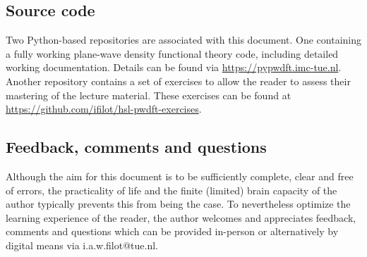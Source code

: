 %
%
%
\subsection{Source code}
Two Python-based repositories are associated with this document. One containing a fully working plane-wave density functional theory code, including detailed working documentation. Details can be found via \url{https://pypwdft.imc-tue.nl}. Another repository contains a set of exercises to allow the reader to assess their mastering of the lecture material. These exercises can be found at \url{https://github.com/ifilot/hsl-pwdft-exercises}.

%
%
%
\subsection{Feedback, comments and questions}

Although the aim for this document is to be sufficiently complete, clear and free of errors, the practicality of life and the finite (limited) brain capacity of the author typically prevents this from being the case. To nevertheless optimize the learning experience of the reader, the author welcomes and appreciates feedback, comments and questions which can be provided in-person or alternatively by digital means via i.a.w.filot@tue.nl.